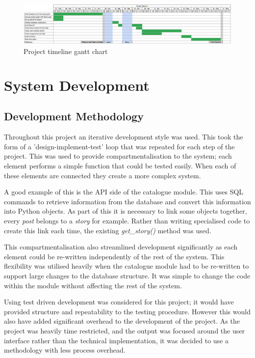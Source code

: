 \documentclass[12pt,titlepage]{article}
\begin{document}
  \clearpage

  \begin{figure}
    \includegraphics[width=\textheight]{../img/gantt.png}
    \caption{Project timeline gantt chart}
    \label{fig:gantt}
  \end{figure}

  \clearpage

\section{System Development}


  \subsection{Development Methodology}

  Throughout this project an iterative development style was used. This took the
  form of a 'design-implement-test' loop that was repeated for each step of the
  project. This was used to provide compartmentalisation to the system; each
  element performs a simple function that could be tested easily. When each of
  these elements are connected they create a more complex system.

  A good example of this is the API side of the catalogue module. This uses SQL
  commands to retrieve information from the database and convert this
  information into Python objects. As part of this it is necessary to link some
  objects together, every \textit{post} belongs to a \textit{story} for example.
  Rather than writing specialised code to create this link each time, the
  existing \textit{get\_story()} method was used.

  This compartmentalisation also streamlined development significantly as each
  element could be re-written independently of the rest of the system. This
  flexibility was utilised heavily when the catalogue module had to be
  re-written to support large changes to the database structure. It was simple
  to change the code within the module without affecting the rest of the system.

  Using test driven development was considered for this project; it would have
  provided structure and repeatability to the testing procedure. However this
  would also have added significant overhead to the development of the project.
  As the project was heavily time restricted, and the output was focused around
  the user interface rather than the technical implementation, it was decided to
  use a methodology with less process overhead.
\end{document}
